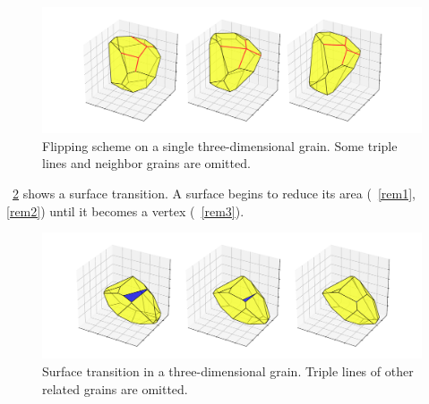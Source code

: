 \begin{figure}[!t]
    \centering
    \includegraphics[trim={0 2em 0 2em},scale=0.37]{figures/3d_voronoi/3D_flipping.pdf}
    \subfloat[\label{flip1}]{\hspace{.2\linewidth}}
    \subfloat[\label{flip2}]{\hspace{.2\linewidth}}
    \subfloat[\label{flip3}]{\hspace{.2\linewidth}}
    \caption[Flipping scheme on a single three-dimensional grain.]{Flipping scheme on a single three-dimensional grain. 
    Some triple lines and neighbor grains are omitted.}
    \label{fig:3Dflipping}
\end{figure}


\figurename~\ref{fig:3Dfaceremoval} shows a surface
transition. A surface begins to reduce its area (\figurename~\ref{rem1}, \ref{rem2}) until it becomes a vertex (\figurename~\ref{rem3}).

\begin{figure}[!t]
    \centering
    \includegraphics[trim={0 2em 0 2em},scale=0.37]{figures/3d_voronoi/3D_surface_removal.pdf}
    \subfloat[\label{rem1}]{\hspace{.2\linewidth}}
    \subfloat[\label{rem2}]{\hspace{.2\linewidth}}
    \subfloat[\label{rem3}]{\hspace{.2\linewidth}}
    \caption[Surface transition in a three-dimensional grain]{Surface transition in a three-dimensional grain. Triple lines of other related grains are omitted.}
    \label{fig:3Dfaceremoval}
\end{figure}

